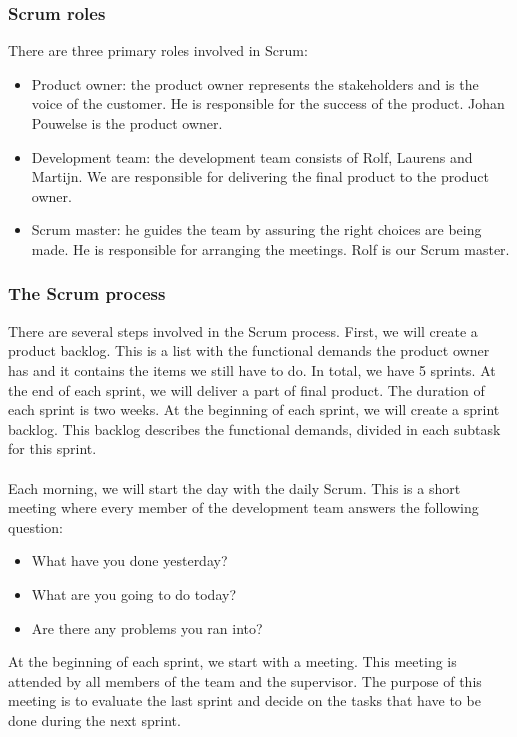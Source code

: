 \subsubsection{Scrum roles}
There are three primary roles involved in Scrum:
\begin{itemize}
\item Product owner: the product owner represents the stakeholders and is the voice of the customer. He is responsible for the success of the product. Johan Pouwelse is the product owner.
\item Development team: the development team consists of Rolf, Laurens and Martijn. We are responsible for delivering the final product to the product owner.
\item Scrum master: he guides the team by assuring the right choices are being made. He is responsible for arranging the meetings. Rolf is our Scrum master.
\end{itemize}

\subsubsection{The Scrum process}
There are several steps involved in the Scrum process. First, we will create a product backlog. This is a list with the functional demands the product owner has and it contains the items we still have to do. In total, we have 5 sprints. At the end of each sprint, we will deliver a part of final product. The duration of each sprint is two weeks. At the beginning of each sprint, we will create a sprint backlog. This backlog describes the functional demands, divided in each subtask for this sprint.\\\\
Each morning, we will start the day with the daily Scrum. This is a short meeting where every member of the development team answers the following question:
\begin{itemize}
\item What have you done yesterday?
\item What are you going to do today?
\item Are there any problems you ran into?
\end{itemize}
At the beginning of each sprint, we start with a meeting. This meeting is attended by all members of the team and the supervisor. The purpose of this meeting is to evaluate the last sprint and decide on the tasks that have to be done during the next sprint.

